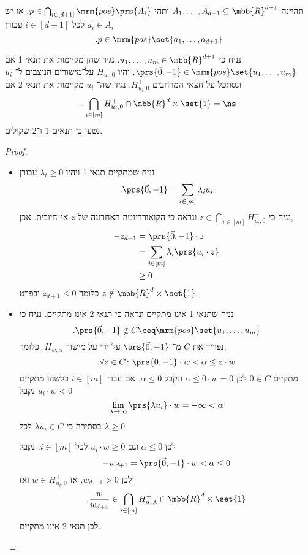 \documentclass[a4paper,10pt,twoside,openany]{book}
\begin{document}
\begin{theorem}
תהיינה
$A_1, \ldots, A_{d+1} \subseteq \mbb{R}^{d+1}$
ותהי
$p \in \bigcap_{i \in [d+1]} \mrm{pos}\prs{A_i}$.
אז יש
$a_i \in A_{i}$
לכל
$i \in [d+1]$
עבורן
\[\text{.} p \in \mrm{pos}\set{a_1, \ldots, a_{d+1}}\]
\end{theorem}

\begin{lemma}\label{lemma:pos-conditions}
נניח כי
$u_1, \ldots, u_m \in \mbb{R}^{d+1}$.
נגיד שהן מקיימות את תנאי
1
אם
$\prs{\vec{0}, -1} \in \mrm{pos}\set{u_1, \ldots, u_m}$.
יהיו
$H_{u_i, 0}$
על־מישורים הניצבים ל־%
$u_i$
ונסתכל על חצאי המרחבים
$H_{u_i, 0}^+$.
נגיד שה־%
$u_i$
מקיימות את תנאי 2 אם
\[\text{.} \bigcap_{i \in [m]} H_{u_i, 0}^+ \cap \mbb{R}^d \times \set{1} = \ns\]
נטען כי תנאים 1 ו־2 שקולים.
\end{lemma}

\begin{proof}
\begin{itemize}
\item נניח שמתקיים תנאי 1 ויהיו
$\lambda_i \geq 0$
עבורן
\[\text{.} \prs{\vec{0}, -1} = \sum_{i \in [m]} \lambda_i u_i\]
נניח כי
$z \in \bigcap_{i \in [m]} H_{u_i, 0}^+$
ונראה כי הקואורדינטה האחרונה של
$z$
אי־חיובית.
אכן,
\begin{align*}
-z_{d+1} &= \prs{\vec{0}, -1} \cdot z
\\&= \sum_{i \in [m]} \lambda_i \prs{u_i \cdot z}
\\&\geq 0
\end{align*}
כלומר
$z_{d+1} \leq 0$
ובפרט
$z \notin \mbb{R}^d \times \set{1}$.
\item נניח שתנאי 1 אינו מתקיים ונראה כי תנאי 2 אינו מתקיים.
נניח כי
\[\text{.} \prs{\vec{0}, -1} \notin C \ceq \mrm{pos}\set{u_1, \ldots, u_m}\]
נפריד את
$C$
מ־%
$\prs{\vec{0}, -1}$
על ידי על מישור
$H_{w,\alpha}$.
כלומר,
\[\text{.} \forall z \in C \colon \prs{0,-1} \cdot w < \alpha \leq z \cdot w\]
מתקיים
$0 \in C$
לכן
$\alpha \leq 0 \cdot w = 0$
ונקבל
$\alpha \leq 0$.
אם עבור
$i \in [m]$
כלשהו מתקיים
$u_i \cdot w < 0$
נקבל
\[\lim_{\lambda \to \infty} \prs{\lambda u_i} \cdot w = -\infty < \alpha\]
בסתירה כי
$\lambda u_i \in C$
לכל
$\lambda \geq 0$.

לכן
$\alpha \leq 0$
וגם
$u_i \cdot w \geq 0$
לכל
$i \in [m]$.
נקבל
\[-w_{d+1} = \prs{\vec{0}, -1} \cdot w < \alpha \leq 0\]
ולכן
$w_{d+1} > 0$.
אז
$w \in H_{u_i, 0}^+$
ואז
\[\text{.} \frac{w}{w_{d+1}} \in \bigcap_{i \in [m]} H_{u_i, 0}^+ \cap \mbb{R}^d \times \set{1}\]
לכן תנאי 2 אינו מתקיים.
\end{itemize}
\end{proof}
\end{document}
